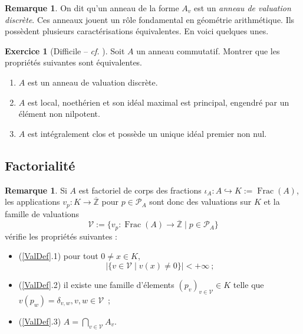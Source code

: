 \documentclass[a4paper, oneside, 12pt]{book}
\theoremstyle{theoremeStyle} %
\theoremstyle{definition} %
\newtheorem{remarque}[theoreme]{Remarque}
\newtheorem{exercice}[theoreme]{Exercice}
\DeclareMathOperator{\Frac}{Frac}
\newcommand{\Z}{\mathbb{Z}}
\begin{document}
\begin{remarque}
On dit qu'un anneau de la forme $A_v$ est un \textit{anneau de valuation discrète}. Ces anneaux jouent un rôle fondamental en géométrie arithmétique. Ils possèdent plusieurs caractérisations équivalentes. En voici quelques unes.
\end{remarque}

\begin{exercice}[{Difficile -- \textit{cf.} \cite[I,\S~2]{CL}}] %
  Soit $A$ un anneau commutatif. Montrer que les propriétés suivantes sont équivalentes.
  \begin{enumerate}
  \item $A$ est un anneau de valuation discrète.
  \item $A$ est local, noethérien et son idéal maximal est principal, engendré par un élément non nilpotent.
  \item $A$ est intégralement clos et possède un unique idéal premier non nul.\\
  \end{enumerate}
\end{exercice}



\subsection{Factorialité}
\begin{remarque}
  Si $A$ est factoriel de corps des fractions $\iota_A:A\hookrightarrow K:=\Frac(A)$, les applications $v_p:K\rightarrow \overline{\Z}$ pour $p\in\mathcal{P}_A$ sont donc des valuations sur $K$ et la famille de valuations
  $$\mathcal{V}:=\{v_p:\Frac(A)\rightarrow \overline{\Z}\; |\; p\in\mathcal{P}_A\}$$
  vérifie les propriétés suivantes :
  \begin{itemize}
  \item (\ref{ValDef}.1) pour tout $0\not=x\in K$, $$|\{v\in\mathcal{V} \;|\; v (x)\not=0\}|<+\infty~;$$
  \item (\ref{ValDef}.2) il existe une famille d'élements $(p_v)_{v\in\mathcal{V}}\in K$ telle que $v(p_w)=\delta_{v,w}, v,w\in\mathcal{V}$~;
  \item (\ref{ValDef}.3) $A=\displaystyle{\bigcap_{v\in\mathcal{V}}}A_v$.
  \end{itemize}
\end{remarque}
\end{document}
